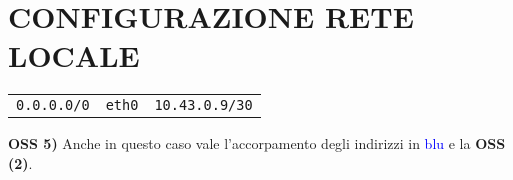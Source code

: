 \documentclass{article}
\def\code#1{\texttt{#1}}
\newenvironment{homeworkProblem}[1][-1]{
    \section{CONFIGURAZIONE RETE LOCALE}
}{}
\begin{document}
\begin{homeworkProblem}
\begin{center}
\begin{tabular}{l l l}
 		\code{0.0.0.0/0} & \code{eth0} & \code{10.43.0.9/30}\\ 		
 	\end{tabular}
	\end{center}	
	\textbf{OSS 5)} Anche in questo caso vale l'accorpamento degli indirizzi in \textcolor{blue}{blu} e la 
	\textbf{OSS (2)}.
	
\end{homeworkProblem}
\end{document}

